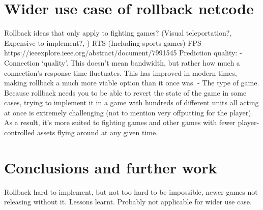 \documentclass{entcs}
\begin{document}
\section{Wider use case of rollback netcode}
Rollback ideas that only apply to fighting games? (Visual teleportation?, Expensive to implement?, ) 
 RTS (Including sports games)
FPS - https://ieeexplore.ieee.org/abstract/document/7991545
Prediction quality:
- Connection ‘quality’. This doesn’t mean bandwidth, but rather how much a connection’s response time fluctuates. This has improved in modern times, making rollback a much more viable option than it once was.
- The type of game. Because rollback needs you to be able to revert the state of the game in some cases, trying to implement it in a game with hundreds of different units all acting at once is extremely challenging (not to mention very offputting for the player). As a result, it’s more suited to fighting games and other games with fewer player-controlled assets flying around at any given time.


\section{Conclusions and further work}

Rollback hard to implement, but not too hard to be impossible, newer games not releasing without it. Lessons learnt. Probably not applicable for wider use case. 
\end{document}
